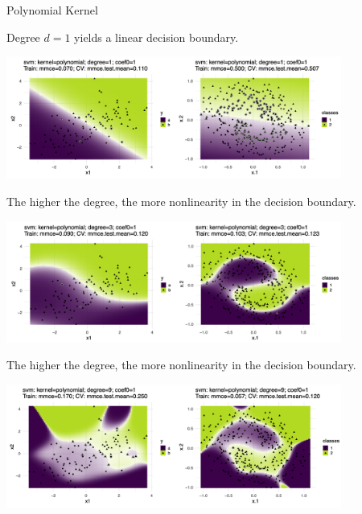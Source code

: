 \begin{vbframe}{Polynomial Kernel}


Degree $d = 1$ yields a linear decision boundary. 

\vspace*{0.1cm} 
\begin{center}
\includegraphics[width = 11cm]{figure_man/polynom_kernel1.png}
\end{center}

\framebreak

The higher the degree, the more nonlinearity in the decision boundary. 

\vspace*{0.1cm}
\begin{center}
\includegraphics[width = 11cm]{figure_man/polynom_kernel2.png}
\end{center}

\framebreak

The higher the degree, the more nonlinearity in the decision boundary. 
\vspace*{0.1cm}
\begin{center}
\includegraphics[width = 11cm]{figure_man/polynom_kernel3.png}
\end{center}

\framebreak 


\end{vbframe}
